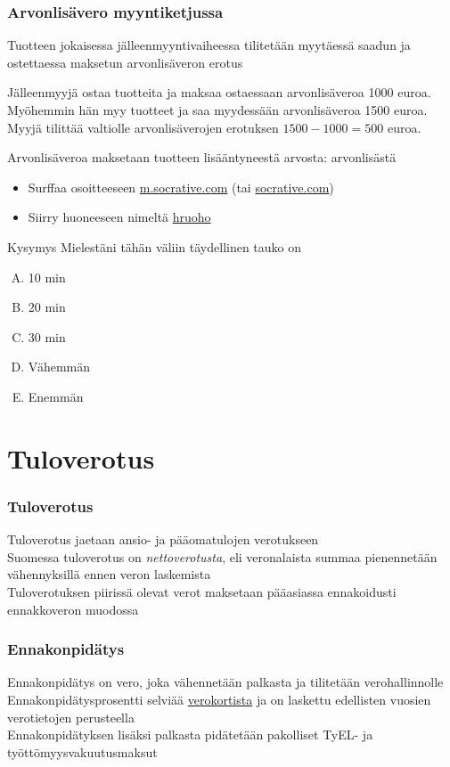 \documentclass{beamer}
\newcommand{\pblock}{\\ \vspace{0.5cm}\pause}
\newcommand{\socrativeOhje}{
\begin{itemize}
\item Surffaa osoitteeseen \url{m.socrative.com} (tai \url{socrative.com})
\item Siirry huoneeseen nimeltä \url{hruoho}
\end{itemize}
}
\newcommand{\taukoKysymys}{
\socrativeOhje
	\begin{block}{Kysymys}
	Mielestäni tähän väliin täydellinen tauko on
	\begin{enumerate}[(A)]
		\item 10 min
		\item 20 min
		\item 30 min
		\item Vähemmän 
		\item Enemmän
	\end{enumerate}	
	\end{block}
}
\begin{document}
\begin{frame}
\frametitle{Arvonlisävero myyntiketjussa}

Tuotteen jokaisessa jälleenmyyntivaiheessa tilitetään myytäessä saadun ja  ostettaessa maksetun arvonlisäveron erotus\pause
\begin{esim}
Jälleenmyyjä ostaa tuotteita ja maksaa ostaessaan arvonlisäveroa 1000 euroa. \pause Myöhemmin hän myy tuotteet ja saa myydessään arvonlisäveroa 1500 euroa. \pause Myyjä tilittää valtiolle arvonlisäverojen erotuksen \(1500-1000=500\) euroa. 
\end{esim}\pause
Arvonlisäveroa maksetaan tuotteen lisääntyneestä arvosta: arvonlisästä
\end{frame}

\begin{frame}
\taukoKysymys
\end{frame}

\section{Tuloverotus}

\begin{frame}
\frametitle{Tuloverotus}
\pause
Tuloverotus jaetaan ansio- ja pääomatulojen verotukseen
\pblock
Suomessa tuloverotus on \emph{nettoverotusta}, eli veronalaista summaa pienennetään vähennyksillä ennen veron laskemista 
\pblock
Tuloverotuksen piirissä olevat verot maksetaan pääasiassa ennakoidusti ennakkoveron muodossa
\end{frame}

\begin{frame}
\frametitle{Ennakonpidätys}
\pause
Ennakonpidätys on vero, joka vähennetään palkasta ja tilitetään verohallinnolle
\pblock
Ennakonpidätysprosentti selviää \href{http://portal.vero.fi/Demo_VKV2015/Sivut/Login.aspx?demoasiakas=d1b73ac40dc9436a86f4b0683cd30d24&culture=fi-FI}{verokortista} ja on laskettu edellisten vuosien verotietojen perusteella
\pblock
Ennakonpidätyksen lisäksi palkasta pidätetään pakolliset TyEL- ja työttömyysvakuutusmaksut
\end{frame}
\end{document}
